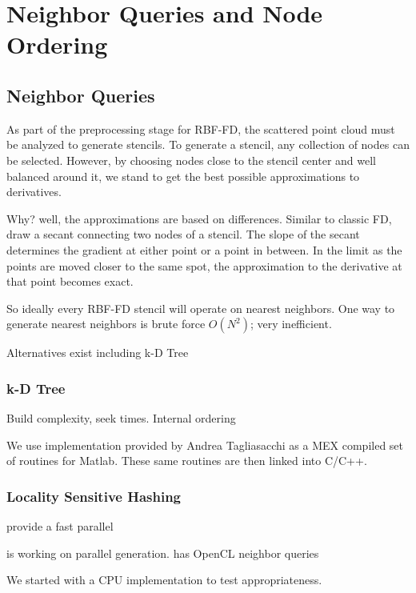
\chapter{Neighbor Queries and Node Ordering}


\section{Neighbor Queries} 

As part of the preprocessing stage for RBF-FD, the scattered point cloud must be analyzed to generate stencils. To generate a stencil, any collection of nodes can be selected. However, by choosing nodes close to the stencil center and well balanced around it, we stand to get the best possible approximations to derivatives. 

Why? well, the approximations are based on differences. Similar to classic FD, draw a secant connecting two nodes of a stencil. The slope of the secant determines the gradient at either point or a point in between. In the limit as the points are moved closer to the same spot, the approximation to the derivative at that point becomes exact. 

So ideally every RBF-FD stencil will operate on nearest neighbors. One way to generate nearest neighbors is brute force $O(N^{2})$; very inefficient. 

Alternatives exist including k-D Tree

\subsection{k-D Tree}
Build complexity, seek times. Internal ordering 

We use implementation provided by Andrea Tagliasacchi \cite{tagliasacchi} as a MEX compiled set of routines for Matlab. These same routines are then linked into C/C++. 

\subsection{Locality Sensitive Hashing}

\cite{Connor2009} provide a fast parallel 

\cite{Henke2012} is working on parallel generation. \cite{IanJohnsonThesis} has OpenCL neighbor queries

We started with a CPU implementation to test appropriateness. 

